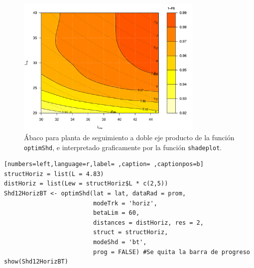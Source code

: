 \begin{figure}[!htb]
\centering
\includegraphics[width=0.8\textwidth]{figuras/codigo-optimshd2x.pdf}
\caption{Ábaco para planta de seguimiento a doble eje producto de la función \texttt{optimShd}, e interpretado graficamente por la función \texttt{shadeplot}.}
\end{figure}
\begin{lstlisting}[numbers=left,language=r,label= ,caption= ,captionpos=b]
structHoriz = list(L = 4.83)
distHoriz = list(Lew = structHoriz$L * c(2,5))
Shd12HorizBT <- optimShd(lat = lat, dataRad = prom,
                         modeTrk = 'horiz',
                         betaLim = 60,
                         distances = distHoriz, res = 2,
                         struct = structHoriz,
                         modeShd = 'bt',
                         prog = FALSE) #Se quita la barra de progreso
show(Shd12HorizBT)
\end{lstlisting}

